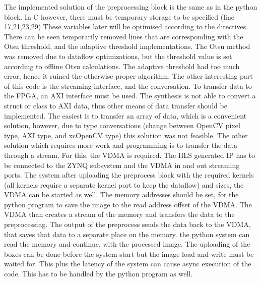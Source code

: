 The implemented solution of the preprocessing block is the same as in the python block.
In C however, there must be temporary storage to be specified (line 17,21,23,29)
These variables later will be optimised according to the directives.
There can be seen temporarily removed lines that are corresponding with the Otsu threshold, and the adaptive threshold implementations.
The Otsu method was removed due to dataflow optimizations, but the threshold value is set according to offline Otsu calculations.
The adaptive threshold had too much error, hence it ruined the otherwise proper algorithm.
The other interesting part of this code is the streaming interface, and the  conversation.
To transfer data to the FPGA, an AXI interface must be used.
The synthesis is not able to convert a struct or class to AXI data, thus other means of data transfer should be implemented.
The easiest is to transfer an array of data, which is a convenient solution, however, due to type conversations (change between OpenCV pixel type, AXI type, and xcOpenCV type) this solution was not feasible.
The other solution which requires more work and programming is to transfer the data through a stream.
For this, the VDMA is required.
The HLS generated IP has to be connected to the ZYNQ subsystem and the VDMA in and out streaming ports.
The system after uploading the preprocess block with the required kernels (all kernels require a separate kernel port to keep the dataflow) and sizes, the VDMA can be started as well.
The memory addresses should be set, for the python program to save the image to the read address offset of the VDMA.
The VDMA than creates a stream of the memory and transfers the data to the preprocessing.
The output of the preprocess sends the data back to the VDMA, that saves that data to a separate place on the memory.
the python system can read the memory and continue, with the processed image.
The uploading of the boxes can be done before the system start but the image load and write must be waited for.
This plus the latency of the system can cause async execution of the code.
This has to be handled by the python program as well.

